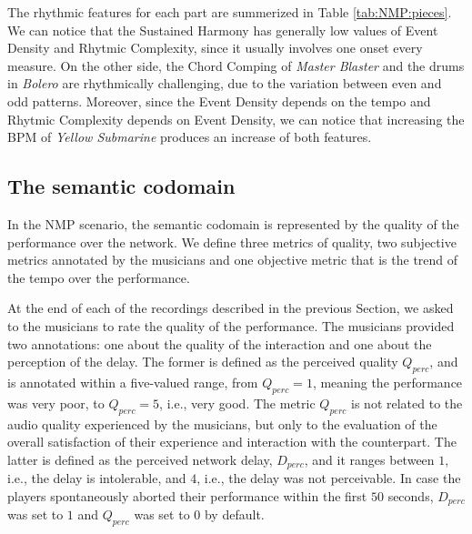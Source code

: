 The rhythmic features for each part are summerized in Table 
\ref{tab:NMP:pieces}. We can notice that the Sustained Harmony has generally low values of Event Density and Rhytmic Complexity, since it usually involves one onset every measure. On the other side, the Chord Comping of \textit{Master Blaster} and the drums in \textit{Bolero} are rhythmically challenging, due to the variation between even and odd patterns. Moreover, since the Event Density depends on the tempo and Rhytmic Complexity depends on Event Density, we can notice that increasing the BPM of \textit{Yellow Submarine} produces an increase of both features.





\subsection{The semantic codomain}\label{sec:NMP:codomain}
In the NMP scenario, the semantic codomain is represented by the quality of the performance over the network. We define three metrics of quality, two subjective metrics annotated by the musicians  and one objective metric that is the trend of the tempo over the performance.

At the end of each of the recordings described in the previous Section, we asked to the musicians to rate the quality of the performance. The musicians provided two annotations: one about the quality of the interaction and one about the perception of the delay. The former is defined as the perceived quality $Q_{perc}$, and is annotated within a five-valued range, from $Q_{perc}=1$, meaning the performance was very poor, to $Q_{perc}=5$, i.e., very good. The metric $Q_{perc}$ is not related to the audio quality experienced by the musicians, but only to the evaluation of the overall satisfaction of their experience and interaction with the counterpart. The latter is defined as the perceived network delay, $D_{perc}$, and it ranges between $1$, i.e., the delay is intolerable, and $4$, i.e., the delay was not perceivable. In case the players spontaneously aborted their performance within the first $50$ seconds, $D_{perc}$ was set to $1$ and $Q_{perc}$ was set to $0$ by default. 

